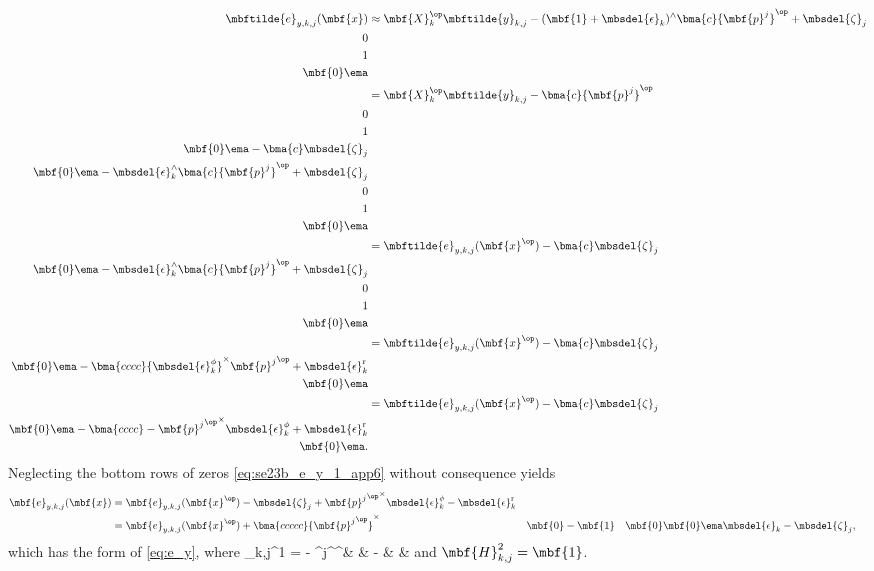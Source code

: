 \begin{align}
	\mbftilde{e}_{y,k,j}(\mbf{x}) &\approx {\mbf{X}_k^\op}\mbftilde{y}_{k,j} - (\mbf{1} + \mbsdel{\epsilon}_k)^\wedge
	\bma{c}
		{\mbf{p}^j}^\op + \mbsdel{\zeta}_j \\
		0 \\
		1 \\
		\mbf{0}
	\ema \notag \\
	&= {\mbf{X}_k^\op}\mbftilde{y}_{k,j} - 	
	\bma{c}
		{\mbf{p}^j}^\op\\
		0 \\
		1 \\
		\mbf{0}
	\ema -
		\bma{c}
		\mbsdel{\zeta}_j \\
		\mbf{0}
	\ema  - \mbsdel{\epsilon}_k^\wedge
	\bma{c}
		{\mbf{p}^j}^\op + \mbsdel{\zeta}_j \\
		0 \\
		1 \\
		\mbf{0}
	\ema  \notag \\
	&= \mbftilde{e}_{y,k,j}(\mbf{x}^\op) -
		\bma{c}
		\mbsdel{\zeta}_j \\
		\mbf{0}
	\ema  - \mbsdel{\epsilon}_k^\wedge
	\bma{c}
		{\mbf{p}^j}^\op + \mbsdel{\zeta}_j \\
		0 \\
		1 \\
		\mbf{0}
	\ema  \notag \\
	&= \mbftilde{e}_{y,k,j}(\mbf{x}^\op) -
		\bma{c}
		\mbsdel{\zeta}_j \\
		\mbf{0}
	\ema  -
	\bma{cccc}
		{\mbsdel{\epsilon}_k^{\phi}}^\times{\mbf{p}^j}^\op  + \mbsdel{\epsilon}_k^\textrm{r}  \\
		\mbf{0}
	\ema \notag \\
	&= \mbftilde{e}_{y,k,j}(\mbf{x}^\op) -
		\bma{c}
		\mbsdel{\zeta}_j \\
		\mbf{0}
	\ema  -
	\bma{cccc}
		-{{\mbf{p}^j}^\op}^\times{\mbsdel{\epsilon}_k^{\phi}} + \mbsdel{\epsilon}_k^\textrm{r}  \\
		\mbf{0}
	\ema. \label{eq:se23b_e_y_1_app6}	
\end{align}
Neglecting the bottom rows of zeros \eqref{eq:se23b_e_y_1_app6} without consequence yields
\begin{align*}
	\mbf{e}_{y,k,j}(\mbf{x}) &= \mbf{e}_{y,k,j}(\mbf{x}^\op) - \mbsdel{\zeta}_j +{{\mbf{p}^j}^\op}^\times{\mbsdel{\epsilon}_k^{\phi}}  - \mbsdel{\epsilon}_k^\textrm{r} \\
	&= \mbf{e}_{y,k,j}(\mbf{x}^\op)  +  \bma{ccccc} {{\mbf{p}^j}^\op}^\times  &  \mbf{0} & -\mbf{1} & \mbf{0} & \mbf{0}  \ema \mbsdel{\epsilon}_k - \mbsdel{\zeta}_j,
\end{align*}
which has the form of \eqref{eq:e_y}, where 
\bdis
	_{k,j}^1 = 
	- 
		{{^j}^\op}^\times   &  & - & \mbf{0} &   
	\ema 
\edis
and $\mbf{H}_{k,j}^2 =  \mbf{1}$. 

